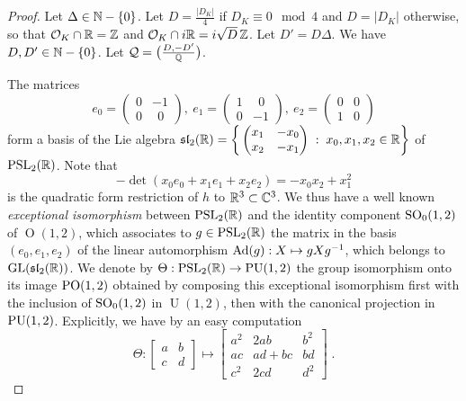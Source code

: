 \documentclass[11pt]{article}
\begin{document}
\begin{proof} Let $\Delta\in{\mathbb N}-\{0\}$. Let $D=\frac{|D_K|}{4}$ if $D_K\equiv 0
\mod 4$ and $D=|D_K|$ otherwise, so that ${\cal O}_K\cap{\mathbb R}={\mathbb Z}$ and
${\cal O}_K\cap i{\mathbb R}= i\sqrt{D}\,{\mathbb Z} $. Let $D'= D\Delta$. We have
$D,D'\in{\mathbb N}-\{0\}$. Let ${\cal Q}=\big(\frac{D,-D'}{{\mathbb Q}}\big)$.


The matrices 
$$
e_0=\begin{pmatrix} 0 & -1 \\ 0 & \ \ 0 \end{pmatrix}, \ 
e_1=\begin{pmatrix} 1 & \ \ 0 \\ 0 & -1 \end{pmatrix}, \ 
e_2=\begin{pmatrix} 0 & 0 \\ 1 & 0 \end{pmatrix}
$$ 
form %
a basis of the Lie algebra ${\mathfrak s}{\mathfrak l}_2({\mathbb R})=
\bigg\{\begin{pmatrix} x_1 & -x_0 \\ x_2 & -x_1 \end{pmatrix} \;:\;
x_0,x_1,x_2\in{\mathbb R}\bigg\}$ of $\operatorname{PSL}_2({\mathbb R})$. Note that
$$
-\det(x_0e_0+x_1e_1+x_2e_2)= - x_0x_2+x_1^2
$$ 
is the quadratic form restriction of $h$ to ${\mathbb R}^3\subset {\mathbb C}^3$.  We
thus have a well known {\it exceptional isomorphism} between
$\operatorname{PSL}_2({\mathbb R})$ and the identity component $\operatorname{SO}_0(1,2)$ of
$\operatorname{O}(1,2)$, which associates to $g \in \operatorname{PSL}_2({\mathbb R})$ the
matrix in the basis $(e_0,e_1,e_2)$ of the linear automorphism
$\operatorname{Ad}(g):X\mapsto gXg^{-1}$, which belongs to $\operatorname{GL}({\mathfrak s}{\mathfrak l}_2({\mathbb R}))$.
We denote by $\Theta: \operatorname{PSL}_2({\mathbb R}) \rightarrow \operatorname{PU}(1,2)$ the group isomorphism
onto its image $\operatorname{PO}(1,2)$ obtained by composing this exceptional
isomorphism first with the inclusion of $\operatorname{SO}_0(1,2)$ in
$\operatorname{U}(1,2)$, then with the canonical projection in
$\operatorname{PU}(1,2)$. Explicitly, we have by an easy computation
$$
\Theta: \begin{bmatrix} a & b \\ c & d \end{bmatrix} \mapsto
\begin{bmatrix} 
a^2 & 2ab & b^2 \\ ac & ad+bc & bd \\ c^2 & 2cd  & d^2 
\end{bmatrix}\;.
$$



\end{proof}
\end{document}
